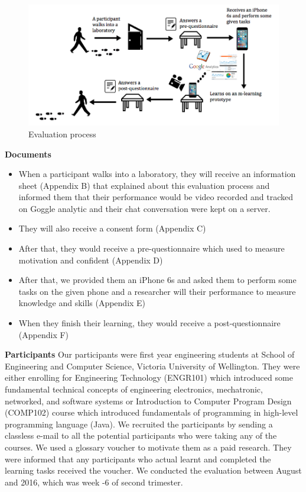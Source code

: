 \begin{figure}[H]
\centering
\includegraphics[width=1.0 \textwidth]{process1}
\caption{Evaluation process}
\end{figure}

\noindent\textbf{Documents}
\begin{itemize}
\item When a participant walks into a laboratory, they will receive an information sheet (Appendix B) that explained about this evaluation process and informed them that their performance would be video recorded and tracked on Goggle analytic and their chat conversation were kept on a server. 
\item They will also receive a consent form (Appendix C)
\item After that, they would receive a pre-questionnaire which used to measure motivation and confident (Appendix D) 
\item After that, we provided them an iPhone 6s and asked them to perform some tasks on the given phone and a researcher will their performance to measure knowledge and skills (Appendix E) 
\item When they finish their learning, they would receive a post-questionnaire (Appendix F)
\end{itemize} 

\textbf{Participants}
\newline
Our participants were first year engineering students at School of Engineering and Computer Science, Victoria University of Wellington. They were either enrolling for Engineering Technology (ENGR101) which introduced some fundamental technical concepts of engineering electronics, mechatronic, networked, and software systems or Introduction to Computer Program Design (COMP102) course which introduced fundamentals of programming in high-level programming language (Java). We recruited the participants by sending a classless e-mail to all the potential participants who were taking any of the courses. We used a glossary voucher to motivate them as a paid research. They were informed that any participants who actual learnt and completed the learning tasks received the voucher. We conducted the evaluation  between August  and  2016, which was week -6 of second trimester. 

